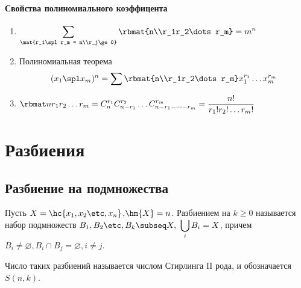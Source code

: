 \documentclass[unicode,10pt]{article}
\begin{document}
\paragraph{Свойства полиномиального коэффицента}
\begin{enumerate}
  \item $\displaystyle \sum\limits_{\tiny \mat{r_1\spl r_m = n\\r_j\ge 0}} \rbmat{n\\r_1r_2\dots r_m} = m^n$
  \item Полиномиальная теорема
    \begin{displaymath}
      (x_1\spl x_m)^n = \sum \rbmat{n\\r_1r_2\dots r_m}x_1^{r_1}\dots x_m^{r_m}
    \end{displaymath}
    \item $\displaystyle \mcr = C_n^{r_1}C_{n-r_1}^{r_2}\dots C_{n-r_1-\dots - r_m}^{r_m} = \frac{n!}{r_1!r_2!\dots r_m!} $
\end{enumerate}
\section{Разбиения}
\subsection{Разбиение на подмножества}
Пусть $X=\hc{\set[x]{n}}$,$\hm{X}=n$. Разбиением на $k\ge 0$ называется
набор подмножеств $\displaystyle \set[B]{k}\subseq X,\  \bigcup\limits_i B_i = X$, причем
$B_i\neq\varnothing, B_i\cap B_j=\varnothing, i\neq j$.
\begin{denote}
  Число таких разбиений называется числом Стирлинга II рода, и обозначается $S(n,k)$.
\end{denote}
\end{document}
